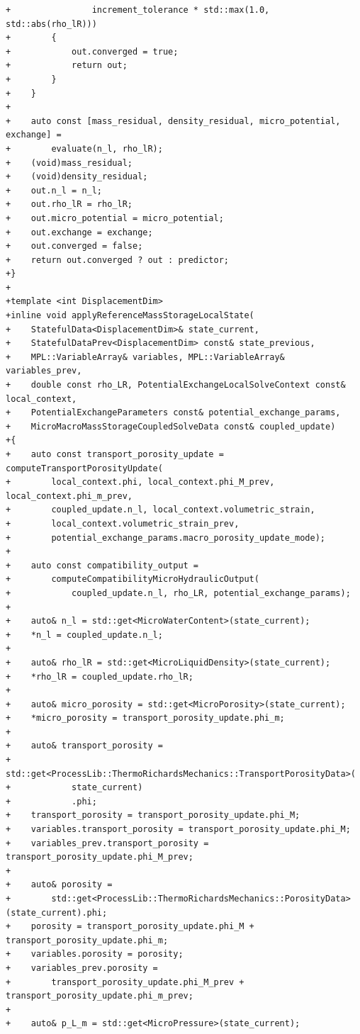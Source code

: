 \documentclass[10pt]{article}
\begin{document}
\begin{lstlisting}
+                increment_tolerance * std::max(1.0, std::abs(rho_lR)))
+        {
+            out.converged = true;
+            return out;
+        }
+    }
+
+    auto const [mass_residual, density_residual, micro_potential, exchange] =
+        evaluate(n_l, rho_lR);
+    (void)mass_residual;
+    (void)density_residual;
+    out.n_l = n_l;
+    out.rho_lR = rho_lR;
+    out.micro_potential = micro_potential;
+    out.exchange = exchange;
+    out.converged = false;
+    return out.converged ? out : predictor;
+}
+
+template <int DisplacementDim>
+inline void applyReferenceMassStorageLocalState(
+    StatefulData<DisplacementDim>& state_current,
+    StatefulDataPrev<DisplacementDim> const& state_previous,
+    MPL::VariableArray& variables, MPL::VariableArray& variables_prev,
+    double const rho_LR, PotentialExchangeLocalSolveContext const& local_context,
+    PotentialExchangeParameters const& potential_exchange_params,
+    MicroMacroMassStorageCoupledSolveData const& coupled_update)
+{
+    auto const transport_porosity_update = computeTransportPorosityUpdate(
+        local_context.phi, local_context.phi_M_prev, local_context.phi_m_prev,
+        coupled_update.n_l, local_context.volumetric_strain,
+        local_context.volumetric_strain_prev,
+        potential_exchange_params.macro_porosity_update_mode);
+
+    auto const compatibility_output =
+        computeCompatibilityMicroHydraulicOutput(
+            coupled_update.n_l, rho_LR, potential_exchange_params);
+
+    auto& n_l = std::get<MicroWaterContent>(state_current);
+    *n_l = coupled_update.n_l;
+
+    auto& rho_lR = std::get<MicroLiquidDensity>(state_current);
+    *rho_lR = coupled_update.rho_lR;
+
+    auto& micro_porosity = std::get<MicroPorosity>(state_current);
+    *micro_porosity = transport_porosity_update.phi_m;
+
+    auto& transport_porosity =
+        std::get<ProcessLib::ThermoRichardsMechanics::TransportPorosityData>(
+            state_current)
+            .phi;
+    transport_porosity = transport_porosity_update.phi_M;
+    variables.transport_porosity = transport_porosity_update.phi_M;
+    variables_prev.transport_porosity = transport_porosity_update.phi_M_prev;
+
+    auto& porosity =
+        std::get<ProcessLib::ThermoRichardsMechanics::PorosityData>(state_current).phi;
+    porosity = transport_porosity_update.phi_M + transport_porosity_update.phi_m;
+    variables.porosity = porosity;
+    variables_prev.porosity =
+        transport_porosity_update.phi_M_prev + transport_porosity_update.phi_m_prev;
+
+    auto& p_L_m = std::get<MicroPressure>(state_current);

\end{lstlisting}
\end{document}
